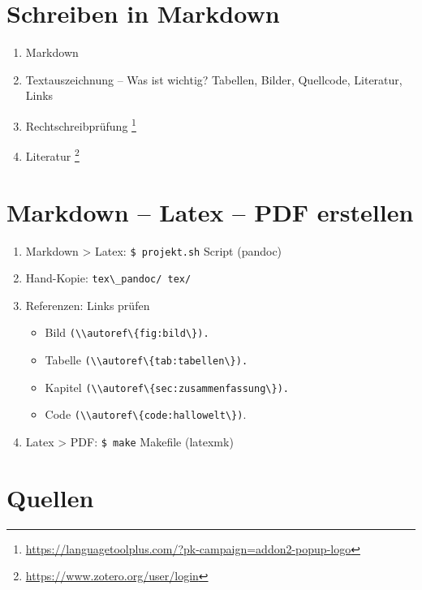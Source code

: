 \section{Schreiben in Markdown}\label{schreiben-in-markdown}

\begin{enumerate}
\item
  Markdown
\item
  Textauszeichnung -- Was ist wichtig? Tabellen, Bilder, Quellcode,
  Literatur, Links
\item
  Rechtschreibprüfung \footnote{\url{https://languagetoolplus.com/?pk-campaign=addon2-popup-logo}}
\item
  Literatur \footnote{\url{https://www.zotero.org/user/login}}
\end{enumerate}

\section{Markdown -- Latex -- PDF
erstellen}\label{markdown-latex-pdf-erstellen}

\begin{enumerate}
\item
  Markdown > Latex: \verb|$ projekt.sh|
  Script (pandoc)
\item
  Hand-Kopie: \verb|tex\_pandoc/ tex/|
\item
  Referenzen: Links prüfen

  \begin{itemize}
  \item
    Bild %
    \verb|(\\autoref\{fig:bild\}).|
  \item
    Tabelle %
    \verb|(\\autoref\{tab:tabellen\}).|
  \item
    Kapitel %
    \verb|(\\autoref\{sec:zusammenfassung\}).|
  \item
    Code %
    \verb|(\\autoref\{code:hallowelt\})|.
  \end{itemize}
\item
  Latex > PDF: \verb|$ make| Makefile
  (latexmk)
\end{enumerate}

\section{Quellen}\label{quellen}

